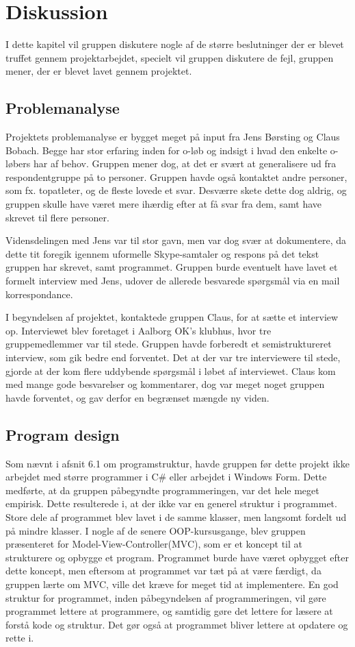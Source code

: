 \chapter{Diskussion}
I dette kapitel vil gruppen diskutere nogle af de større beslutninger der er blevet truffet gennem projektarbejdet, specielt vil gruppen diskutere de fejl, gruppen mener, der er blevet lavet gennem projektet. 
\section{Problemanalyse}
Projektets problemanalyse er bygget meget på input fra Jens Børsting og Claus Bobach. Begge har stor erfaring inden for o-løb og indsigt i hvad den enkelte o-løbers har af behov. Gruppen mener dog, at det er svært at generalisere ud fra respondentgruppe på to personer. Gruppen havde også kontaktet andre personer, som fx. topatleter, og de fleste lovede et svar. Desværre skete dette dog aldrig, og gruppen skulle have været mere ihærdig efter at få svar fra dem, samt have skrevet til flere personer. 

Vidensdelingen med Jens var til stor gavn, men var dog svær at dokumentere, da dette tit foregik igennem uformelle Skype-samtaler og respons på det tekst gruppen har skrevet, samt programmet. Gruppen burde eventuelt have lavet et formelt interview med Jens, udover de allerede besvarede spørgsmål via en mail korrespondance. 

I begyndelsen af projektet, kontaktede gruppen Claus, for at sætte et interview op. Interviewet blev foretaget i Aalborg OK’s klubhus, hvor tre gruppemedlemmer var til stede. Gruppen havde forberedt et semistruktureret interview, som gik bedre end forventet. Det at der var tre interviewere til stede, gjorde at der kom flere uddybende spørgsmål i løbet af interviewet. Claus kom med mange gode besvarelser og kommentarer, dog var meget noget gruppen havde forventet, og gav derfor en begrænset mængde ny viden. 
\section{Program design}
Som nævnt i afsnit 6.1 om programstruktur, havde gruppen før dette projekt ikke arbejdet med større programmer i C\# eller arbejdet i Windows Form. Dette medførte, at da gruppen påbegyndte programmeringen, var det hele meget empirisk. Dette resulterede i, at der ikke var en generel struktur i programmet. Store dele af programmet blev lavet i de samme klasser, men langsomt fordelt ud på mindre klasser. I nogle af de senere OOP-kursusgange, blev gruppen præsenteret for Model-View-Controller(MVC), som er et koncept til at strukturere og opbygge et program. Programmet burde have været opbygget efter dette koncept, men eftersom at programmet var tæt på at være færdigt, da gruppen lærte om MVC, ville det kræve for meget tid at implementere.\newline
En god struktur for programmet, inden påbegyndelsen af programmeringen, vil gøre programmet lettere at programmere, og samtidig gøre det lettere for læsere at forstå kode og struktur. Det gør også at programmet bliver lettere at opdatere og rette i. 

